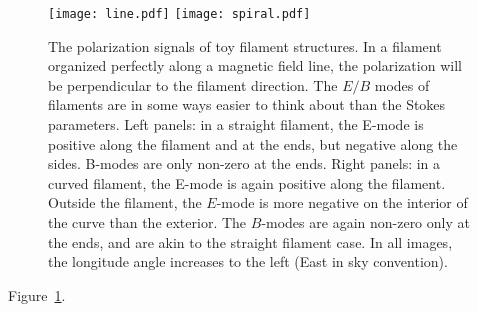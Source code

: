 \begin{figure}
  \texttt{[image: line.pdf]}
  \texttt{[image: spiral.pdf]}
  \caption{
    The polarization signals of toy filament structures.
    In a filament organized perfectly along a magnetic field line, the polarization will be perpendicular to the filament direction.  The $E/B$ modes of filaments are in some ways easier to think about than the Stokes parameters.
    Left panels: in a straight filament, the E-mode is positive along the filament and at the ends, but negative along the sides.  B-modes are only non-zero at the ends.  Right panels: in a curved filament, the E-mode is again positive along the filament.  Outside the filament, the $E$-mode is more negative on the interior of the curve than the exterior.  The $B$-modes are again non-zero only at the ends, and are akin to the straight filament case.
    In all images, the longitude angle increases to the left (East in sky convention).}
  \label{fig:polfilaments}
\end{figure}



  Figure~\ref{fig:polfilaments}.
 

